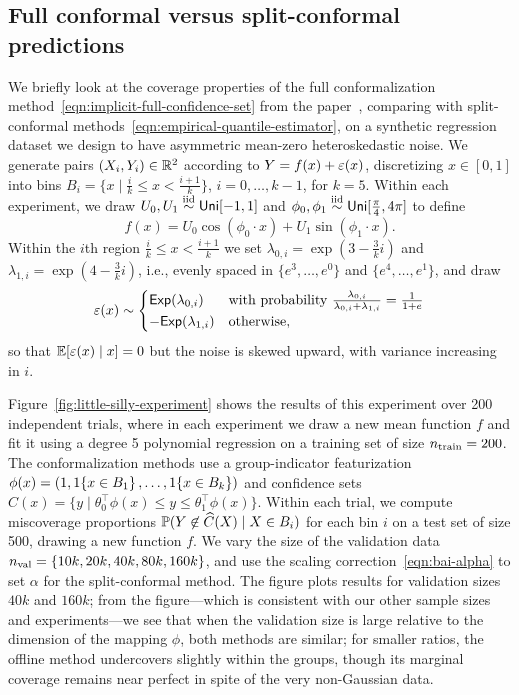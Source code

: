 \documentclass{article}
\begin{document}
\subsection{Full conformal versus split-conformal predictions}
\label{sec:offline-sin-simulation}

We briefly look at the coverage properties of the full conformalization
method~\eqref{eqn:implicit-full-confidence-set} from the
paper~\citep{GibbsChCa23}, comparing with split-conformal
methods~\eqref{eqn:empirical-quantile-estimator}, on a synthetic regression
dataset we design to have asymmetric mean-zero heteroskedastic noise.
%
We generate pairs $(X_i, Y_i) \in \mathbb{R}^2$ according to
$Y = f(x) + \varepsilon(x)$,
discretizing $x \in [0, 1]$ into bins
$B_i = \{x \mid \frac{i}{k} \le x < \frac{i + 1}{k}\}$,
$i = 0, \ldots, k - 1$, for $k = 5$.
%
Within each experiment, we
draw $U_0, U_1 \stackrel{\rm iid}{\sim} \mathsf{Uni}[-1, 1]$ and
$\phi_0, \phi_1 \stackrel{\rm iid}{\sim} \mathsf{Uni}[\frac{\pi}{4}, 4 \pi]$
to define
\begin{equation*}
  f(x) = U_0 \cos(\phi_0 \cdot x)
  + U_1 \sin(\phi_1 \cdot x).
\end{equation*}
Within the $i$th region $\frac{i}{k} \le x < \frac{i + 1}{k}$ we
set $\lambda_{0,i} = \exp(3 - \frac{3}{k} i)$ and
$\lambda_{1,i} = \exp(4 - \frac{3}{k} i)$, i.e.,
evenly spaced in $\{e^{3}, \ldots, e^0\}$ and $\{e^{4}, \ldots, e^{1}\}$,
and draw
\begin{equation*}
  \varepsilon(x) \sim \begin{cases} \mathsf{Exp}(\lambda_{0,i})
    & \mbox{with probability}~
    \frac{\lambda_{0,i}}{\lambda_{0,i} + \lambda_{1,i}}
    = \frac{1}{1 + e} \\
    -\mathsf{Exp}(\lambda_{1,i})
    & \mbox{otherwise},
  \end{cases}
\end{equation*}
so that $\mathbb{E}[\varepsilon(x) \mid x] = 0$ but the noise is skewed upward,
with variance increasing in $i$.

Figure~\ref{fig:little-silly-experiment} shows the results of this
experiment over 200 independent trials, where in each
experiment we draw a new mean function $f$ and fit it using
a degree 5 polynomial regression on a training
set of size $n_{\textup{train}} = 200$.
%
The conformalization methods use a group-indicator featurization $\phi(x) =
(1, 1\!\left\{x \in B_1\right\}, \ldots, 1\!\left\{x \in B_k\right\})$ and confidence sets
$C(x) = \{y \mid \theta_0^\top \phi(x) \le y \le \theta_1^\top
\phi(x)\}$.
%
Within each trial, we compute miscoverage
proportions $\mathbb{P}(Y \not \in \widehat{C}(X) \mid X \in B_i)$ for each bin $i$ on
a test set of size 500, drawing a new function $f$.
%
We vary the size of the validation data $n_{\textup{val}}
= \{10 k, 20k, 40k, 80k, 160k\}$, and
use the scaling correction~\eqref{eqn:bai-alpha} to set $\alpha$ for
the split-conformal method.
%
The figure plots results for validation sizes $40k$ and $160k$; from the
figure---which is consistent with our other sample sizes and
experiments---we see that when the validation size is large relative to the
dimension of the mapping $\phi$, both methods are similar; for smaller
ratios, the offline method undercovers slightly within the groups, though
its marginal coverage remains near perfect in spite of the very non-Gaussian
data.
\end{document}
